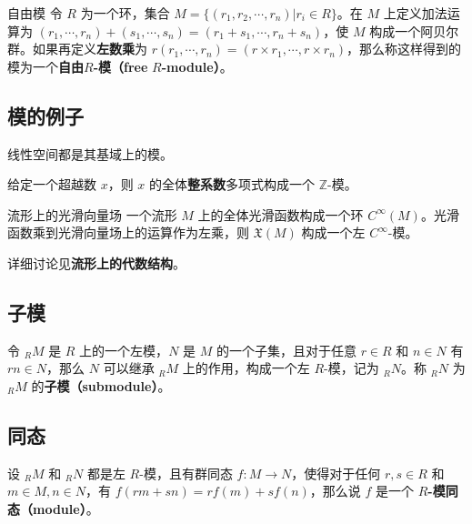 \begin{definition}{自由模}
令 $R$ 为一个环，集合 $M=\{(r_1, r_2, \cdots, r_n)|r_i\in R\}$。在 $M$ 上定义加法运算为 $(r_1, \cdots, r_n)+(s_1, \cdots, s_n)=(r_1+s_1, \cdots, r_n+s_n)$，使 $M$ 构成一个阿贝尔群。如果再定义\textbf{左数乘}为 $r(r_1, \cdots, r_n)=(r\times r_1, \cdots, r\times r_n)$，那么称这样得到的模为一个\textbf{自由}$R$\textbf{-模（free} $R$\textbf{-module）}。
\end{definition}





\subsection{模的例子}

\begin{example}{}
线性空间都是其基域上的模。
\end{example}

\begin{example}{}
给定一个超越数 $x$，则 $x$ 的全体\textbf{整系数}多项式构成一个 $\mathbb{Z}$-模。
\end{example}

\begin{example}{流形上的光滑向量场}
一个流形 $M$ 上的全体光滑函数构成一个环 $C^{\infty}(M)$。光滑函数乘到光滑向量场上的运算作为左乘，则 $\mathfrak{X}(M)$ 构成一个左 $C^{\infty}$-模。

详细讨论见\textbf{流形上的代数结构}。
\end{example}


\subsection{子模}

令 $_RM$ 是 $R$ 上的一个左模，$N$ 是 $M$ 的一个子集，且对于任意 $r\in R$ 和 $n\in N$ 有 $rn\in N$，那么 $N$ 可以继承 $_RM$ 上的作用，构成一个左 $R$-模，记为 $_RN$。称 $_RN$ 为 $_RM$ 的\textbf{子模（submodule）}。


\subsection{同态}

设 $_RM$ 和 $_RN$ 都是左 $R$-模，且有群同态 $f:M\to N$，使得对于任何 $r, s\in R$ 和 $m\in M, n\in N$，有 $f(rm+sn)=rf(m)+sf(n)$，那么说 $f$ 是一个 $R$\textbf{-模同态（module）}。











